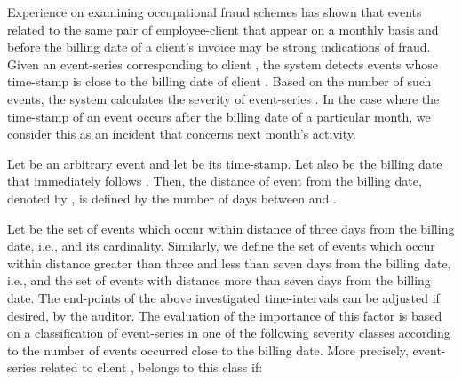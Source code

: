 \documentclass[conference]{IEEEtran}
\begin{document}
Experience on examining occupational fraud schemes has shown that
events related to the same pair of employee-client that appear on a
monthly basis and before the billing date of a client's invoice may
be strong indications of fraud. Given an event-series 
corresponding to client , the system detects events whose
time-stamp is close to the billing date of client . Based on the
number of such events, the system calculates the severity of
event-series . In the case where the time-stamp of an event
occurs after the billing date of a particular month, we consider
this as an incident that concerns next month's activity.

Let  be an arbitrary event and let  be its time-stamp. Let
also  be the billing date that immediately follows .
Then, the distance of event  from the billing date, denoted by
, is defined by the number of days between  and .

Let  be the set of events which occur within distance of
three days from the billing date, i.e.,  and  its cardinality. Similarly, we define the
set of events which occur within distance greater than three and
less than seven days from the billing date, i.e.,  and the set of events  with distance more than seven days from the billing
date. The end-points of the above investigated time-intervals can be
adjusted if desired, by the auditor. The evaluation of the
importance of this factor is based on a classification of
event-series  in one of the following severity classes
according to the number of events occurred close to the billing
date. More precisely, event-series  related to client ,
belongs to this class if:
\end{document}
